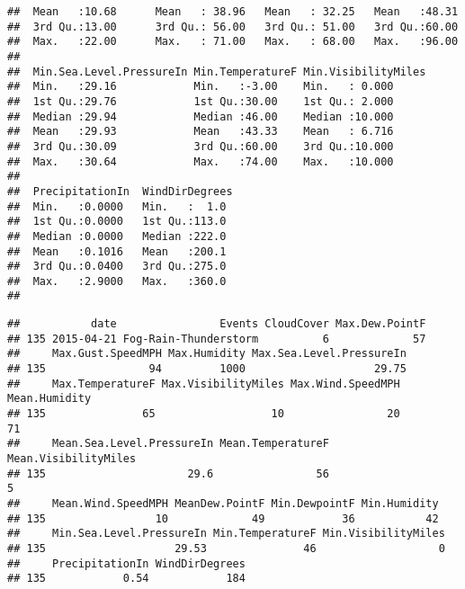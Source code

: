 \documentclass[]{article}
\newenvironment{Shaded}{\begin{snugshade}}{\end{snugshade}}
\newcommand{\KeywordTok}[1]{\textcolor[rgb]{0.13,0.29,0.53}{\textbf{#1}}}
\newcommand{\DecValTok}[1]{\textcolor[rgb]{0.00,0.00,0.81}{#1}}
\newcommand{\StringTok}[1]{\textcolor[rgb]{0.31,0.60,0.02}{#1}}
\newcommand{\CommentTok}[1]{\textcolor[rgb]{0.56,0.35,0.01}{\textit{#1}}}
\newcommand{\OperatorTok}[1]{\textcolor[rgb]{0.81,0.36,0.00}{\textbf{#1}}}
\newcommand{\NormalTok}[1]{#1}
\begin{document}
\begin{verbatim}
##  Mean   :10.68      Mean   : 38.96   Mean   : 32.25   Mean   :48.31  
##  3rd Qu.:13.00      3rd Qu.: 56.00   3rd Qu.: 51.00   3rd Qu.:60.00  
##  Max.   :22.00      Max.   : 71.00   Max.   : 68.00   Max.   :96.00  
##                                                                      
##  Min.Sea.Level.PressureIn Min.TemperatureF Min.VisibilityMiles
##  Min.   :29.16            Min.   :-3.00    Min.   : 0.000     
##  1st Qu.:29.76            1st Qu.:30.00    1st Qu.: 2.000     
##  Median :29.94            Median :46.00    Median :10.000     
##  Mean   :29.93            Mean   :43.33    Mean   : 6.716     
##  3rd Qu.:30.09            3rd Qu.:60.00    3rd Qu.:10.000     
##  Max.   :30.64            Max.   :74.00    Max.   :10.000     
##                                                               
##  PrecipitationIn  WindDirDegrees 
##  Min.   :0.0000   Min.   :  1.0  
##  1st Qu.:0.0000   1st Qu.:113.0  
##  Median :0.0000   Median :222.0  
##  Mean   :0.1016   Mean   :200.1  
##  3rd Qu.:0.0400   3rd Qu.:275.0  
##  Max.   :2.9000   Max.   :360.0  
## 
\end{verbatim}

\begin{Shaded}
\end{Shaded}

\begin{verbatim}
##           date                Events CloudCover Max.Dew.PointF
## 135 2015-04-21 Fog-Rain-Thunderstorm          6             57
##     Max.Gust.SpeedMPH Max.Humidity Max.Sea.Level.PressureIn
## 135                94         1000                    29.75
##     Max.TemperatureF Max.VisibilityMiles Max.Wind.SpeedMPH Mean.Humidity
## 135               65                  10                20            71
##     Mean.Sea.Level.PressureIn Mean.TemperatureF Mean.VisibilityMiles
## 135                      29.6                56                    5
##     Mean.Wind.SpeedMPH MeanDew.PointF Min.DewpointF Min.Humidity
## 135                 10             49            36           42
##     Min.Sea.Level.PressureIn Min.TemperatureF Min.VisibilityMiles
## 135                    29.53               46                   0
##     PrecipitationIn WindDirDegrees
## 135            0.54            184
\end{verbatim}
\end{document}
